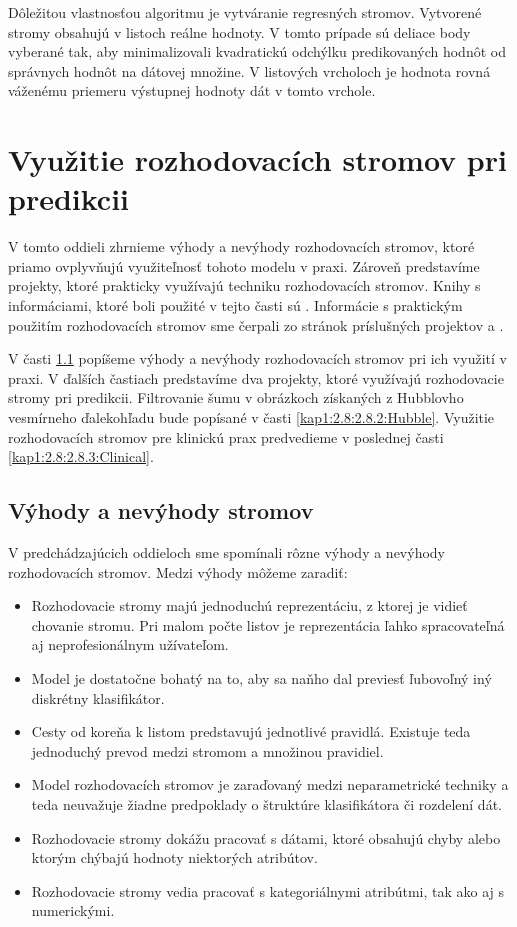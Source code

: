 Dôležitou vlastnosťou algoritmu je vytváranie regresných stromov. Vytvorené stromy obsahujú v listoch reálne hodnoty. V tomto prípade sú deliace body vyberané tak, aby minimalizovali kvadratickú odchýlku predikovaných hodnôt od správnych hodnôt na dátovej množine. V listových vrcholoch je hodnota rovná váženému priemeru výstupnej hodnoty dát v tomto vrchole.

\section{Využitie rozhodovacích stromov pri predikcii}\label{kap1:2.8:DTUsage}
V tomto oddieli zhrnieme výhody a nevýhody rozhodovacích stromov, ktoré priamo ovplyvňujú využiteľnosť tohoto modelu v praxi. Zároveň predstavíme projekty, ktoré prakticky využívajú techniku rozhodovacích stromov. Knihy s informáciami, ktoré boli použité v tejto časti sú \cite{kap1-DataMiningAndAnalysis,kap1-DataMiningForTrees}. Informácie s praktickým použitím rozhodovacích stromov sme čerpali zo stránok príslušných projektov \cite{online-astronomy} a \cite{online-psychoterapy}.

V časti \ref{kap1:2.8:2.8.1:AdvAndDis} popíšeme výhody a nevýhody rozhodovacích stromov pri ich využití v praxi. V ďalších častiach predstavíme dva projekty, ktoré využívajú rozhodovacie stromy pri predikcii. Filtrovanie šumu v obrázkoch získaných z Hubblovho vesmírneho ďalekohľadu bude popísané v časti \ref{kap1:2.8:2.8.2:Hubble}. Využitie rozhodovacích stromov pre klinickú prax predvedieme v poslednej časti \ref{kap1:2.8:2.8.3:Clinical}.

\subsection{Výhody a nevýhody stromov}\label{kap1:2.8:2.8.1:AdvAndDis}
V predchádzajúcich oddieloch sme spomínali rôzne výhody a nevýhody rozhodovacích stromov. Medzi výhody môžeme zaradiť:
\begin{itemize}
\item Rozhodovacie stromy majú jednoduchú reprezentáciu, z ktorej je vidieť chovanie stromu. Pri malom počte listov je reprezentácia ľahko spracovateľná aj neprofesionálnym užívateľom.
\item Model je dostatočne bohatý na to, aby sa naňho dal previesť ľubovoľný iný diskrétny klasifikátor.
\item Cesty od koreňa k listom predstavujú jednotlivé pravidlá. Existuje teda jednoduchý prevod medzi stromom a množinou pravidiel.
\item Model rozhodovacích stromov je zaraďovaný medzi neparametrické techniky a teda neuvažuje žiadne predpoklady o štruktúre klasifikátora či rozdelení dát.
\item Rozhodovacie stromy dokážu pracovať s dátami, ktoré obsahujú chyby alebo ktorým chýbajú hodnoty niektorých atribútov.
\item Rozhodovacie stromy vedia pracovať s kategoriálnymi atribútmi, tak ako aj s numerickými.
\end{itemize}


